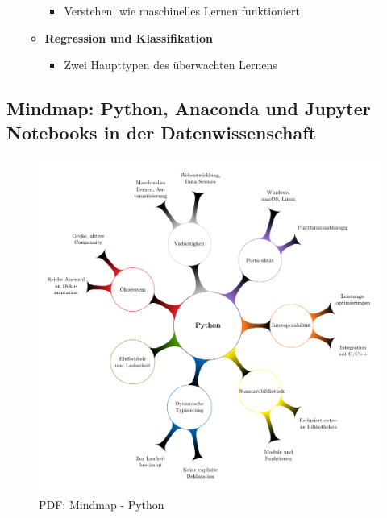 \documentclass{vorlage-design-main}
\begin{document}
\begin{enumerate}
\begin{itemize}
    \begin{itemize}
    
    \item
      Verstehen, wie maschinelles Lernen funktioniert
    \end{itemize}
  \item
    \textbf{Regression und Klassifikation}

    \begin{itemize}
    
    \item
      Zwei Haupttypen des überwachten Lernens
    \end{itemize}
  \end{itemize}
\end{enumerate}

\subsection{Mindmap: Python, Anaconda und Jupyter Notebooks in der
Datenwissenschaft}\label{mindmap-python-anaconda-und-jupyter-notebooks-in-der-datenwissenschaft}

\begin{figure}
\centering
\includegraphics[keepaspectratio]{images/Mindmap-Python.pdf}
\caption{PDF: Mindmap - Python}
\end{figure}
\end{document}
